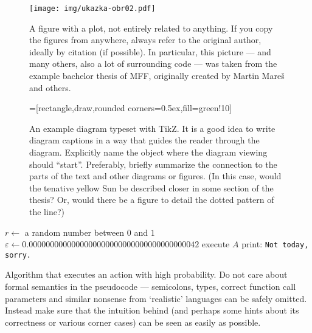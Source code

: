\begin{figure}
\centering
\texttt{[image: img/ukazka-obr02.pdf]}
\caption{A figure with a plot, not entirely related to anything. If you copy the figures from anywhere, always refer to the original author, ideally by citation (if possible). In particular, this picture --- and many others, also a lot of surrounding code --- was taken from the example bachelor thesis of MFF, originally created by Martin Mareš and others.}
\label{fig:g}
\end{figure}

\begin{figure}
\centering
{}=[rectangle,draw,rounded corners=0.5ex,fill=green!10]
\caption{An example diagram typeset with TikZ. It is a good idea to write diagram captions in a way that guides the reader through the diagram. Explicitly name the object where the diagram viewing should ``start''. Preferably, briefly summarize the connection to the parts of the text and other diagrams or figures. (In this case, would the tenative yellow Sun be described closer in some section of the thesis? Or, would there be a figure to detail the dotted pattern of the line?)}
\label{fig:schema}
\end{figure}

\begin{algorithm}
\begin{algorithmic}
	\State $r \gets$ a random number between $0$ and $1$
	\State $\varepsilon \gets 0.0000000000000000000000000000000000000042$
		\State execute $A$ 
	\Else
		\State print: \texttt{Not today, sorry.}
	\EndIf
\EndFunction
\end{algorithmic}
\caption{Algorithm that executes an action with high probability. Do not care about formal semantics in the pseudocode --- semicolons, types, correct function call parameters and similar nonsense from `realistic' languages can be safely omitted. Instead make sure that the intuition behind (and perhaps some hints about its correctness or various corner cases) can be seen as easily as possible.}
\label{alg:w}
\end{algorithm}

